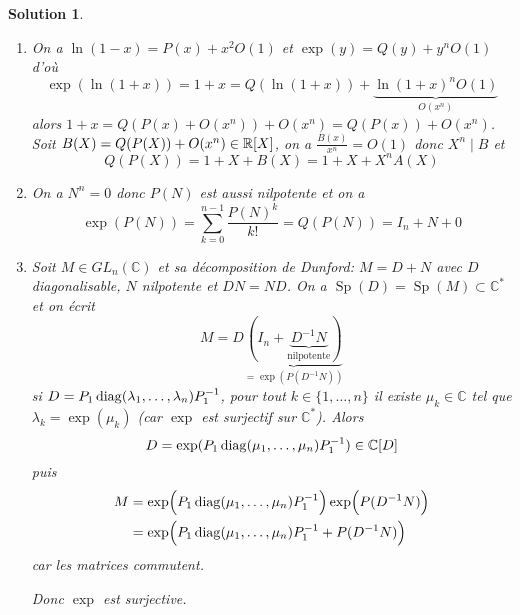 \documentclass[12pt]{article}
\newtheorem{solution}{Solution}[section]
\theoremstyle{remark}
\newcommand{\C}{\mathbb{C}} \newcommand{\Q}{\mathbb{Q}}
\DeclareMathOperator{\Sp}{Sp} \DeclareMathOperator{\mat}{mat}
\numberwithin{equation}{section}
\begin{document}
\begin{solution}
	\phantom{}
	\begin{enumerate}
		\item On a $\ln(1-x)=P(x)+x^{2}O(1)$ et $\exp(y)=Q(y)+y^{n}O(1)$ d'où 
		$$\exp(\ln(1+x))=1+x=Q(\ln(1+x))+\underbrace{\ln(1+x)^{n}O(1)}_{O(x^{n})}$$
		alors $1+x=Q(P(x)+O(x^{n}))+O(x^{n})=Q(P(x))+O(x^{n})$. Soit $B(X)=Q(P(X))+O(x^{n})\in\mathbb{R}[X]$, on a $\frac{B(x)}{x^{n}}=O(1)$ donc $X^{n}\mid B$ et $$Q(P(X))=1+X+B(X)=1+X+X^{n}A(X)$$

		\item On a $N^{n}=0$ donc $P(N)$ est aussi nilpotente et on a 
		$$\exp(P(N))=\sum_{k=0}^{n-1}\frac{P(N)^{k}}{k!}=Q(P(N))=I_{n}+N+0$$

		\item Soit $M\in GL_{n}(\C)$ et sa décomposition de Dunford: $M=D+N$ avec $D$ diagonalisable, $N$ nilpotente et $DN=ND$. On a $\Sp(D)=\Sp(M)\subset\C^{*}$ et on écrit
		$$M=D\underbrace{(I_{n}+\underbrace{D^{-1}N}_{\text{nilpotente}})}_{=\exp(P(D^{-1}N))}$$
		si $D=P_{1}\operatorname{diag}(\lambda_{1},\dots,\lambda_{n})P_{1}^{-1}$, pour tout $k\in\{1,\dots,n\}$ il existe $\mu_{k}\in\C$ tel que $\lambda_{k}=\exp(\mu_{k})$ (car $\exp$ est surjectif sur $\C^{*}$). Alors 
		$$
		D=\exp(P_{1}\diag(\mu_{1},\dots,\mu_{n})P_{1}^{-1})\in\C[D]
		$$
		puis 
		\begin{align*}
			M
			&=\exp\Bigl(P_{1}\operatorname{diag}(\mu_{1},\dots,\mu_{n})P_{1}^{-1}\Bigr)\exp\Bigl(P(D^{-1}N)\Bigr)\\
			&=\exp\Bigl(P_{1}\operatorname{diag}(\mu_{1},\dots,\mu_{n})P_{1}^{-1}+P(D^{-1}N)\Bigr)
		\end{align*}
		car les matrices commutent.

		Donc $\exp$ est surjective.
	\end{enumerate}
\end{solution}
\end{document}
